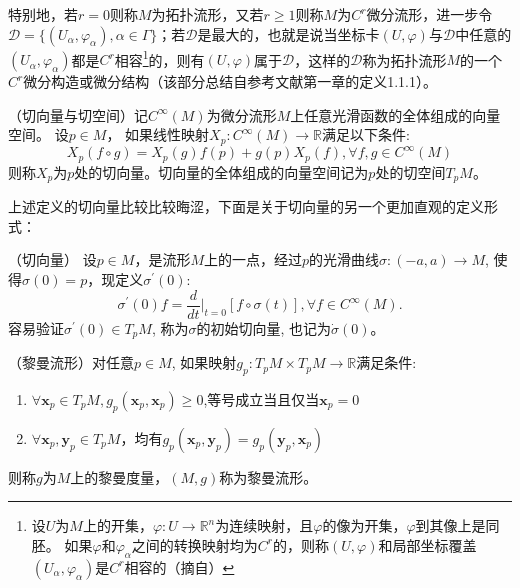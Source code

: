 特别地，若$r=0$则称$M$为拓扑流形，又若$r\geq 1$则称$M$为$C^r$微分流形，进一步令$\mathcal{D}=\{(U_{\alpha},\varphi_\alpha),\alpha \in \Gamma\}$；若$\mathcal{D}$是最大的，也就是说当坐标卡$(U,\varphi)$与$\mathcal{D}$中任意的$(U_{\alpha},\varphi_\alpha)$都是$C^r$相容\footnote{设$U$为$M$上的开集，$\varphi:U \rightarrow \mathbb{R}^{n}$为连续映射，且$\varphi$的像为开集，$\varphi$到其像上是同胚。 如果$\varphi$和$\varphi_\alpha$之间的转换映射均为$C^r$的，则称$(U,\varphi)$和局部坐标覆盖$(U_\alpha, \varphi_{\alpha})$是$C^r$相容的（摘自\cite{Manifold}）}的，则有$(U,\varphi)$属于$\mathcal{D}$，这样的$\mathcal{D}$称为拓扑流形$M$的一个$C^r$微分构造或微分结构（该部分总结自参考文献\cite{Manifold}第一章的定义1.1.1）。
\begin{definition}[a]
\label{Tangent_Vector_a}
{\heiti（切向量与切空间）}记$C^\infty(M)$为微分流形$M$上任意光滑函数的全体组成的向量空间。 设$p \in M$， 如果线性映射$X_p : C^\infty(M) \rightarrow \mathbb{R}$满足以下条件:
\begin{displaymath}
X_p(f\circ g) = X_p(g)f(p)+g(p)X_p(f),\forall f,g \in C^\infty(M)
\end{displaymath}
则称$X_p$为$p$处的切向量。切向量的全体组成的向量空间记为$p$处的切空间$T_pM$。
\end{definition}
上述定义的切向量比较比较晦涩，下面是关于切向量的另一个更加直观的定义形式：
\addtocounter{definition}{-1}
\begin{definition}[b]
\label{Tangent_Vector_b}
{\heiti（切向量）}
设$p\in M$，是流形$M$上的一点，经过$p$的光滑曲线$\sigma: (-a,a) \rightarrow  M$, 使得$\sigma(0)=p$，现定义$\sigma^{\prime}(0)$:
\begin{displaymath}
\sigma^{\prime}(0)f=\frac{d}{dt}|_{t=0}[f\circ\sigma(t)],\forall f \in C^\infty(M).
\end{displaymath}
容易验证$\sigma^{\prime}(0)\in T_pM$, 称为$\sigma$的初始切向量, 也记为$\dot{\sigma}(0)$。
\end{definition}
\begin{definition}
{\heiti（黎曼流形）}对任意$p\in M$, 如果映射$g_p : T_pM \times T_pM \rightarrow \mathbb{R}$满足条件:
\begin{enumerate}
\item $\forall \bm{x}_p \in T_p M,g_p(\bm{x}_p,\bm{x}_p)\geq 0$,等号成立当且仅当$\bm{x}_p=0$
\item $\forall \bm{x}_p,\bm{y}_p \in T_p M$，均有$g_p(\bm{x}_p,\bm{y}_p)=g_p(\bm{y}_p,\bm{x}_p)$
\end{enumerate}
则称$g$为$M$上的黎曼度量，$(M,g)$称为黎曼流形。
\end{definition}
